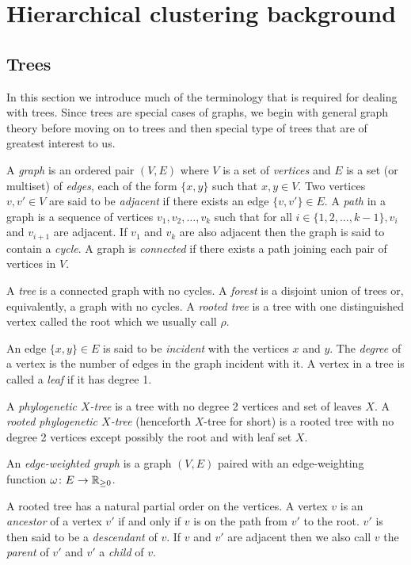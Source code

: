 \chapter{Hierarchical clustering background}
\label{cha:hier-clust-backgr}

\section{Trees}
\label{sec:trees}

In this section we introduce much of the terminology that is required for
dealing with trees.  Since trees are special cases of graphs, we begin with
general graph theory before moving on to trees and then special type of trees
that are of greatest interest to us.

A \textit{graph} is an ordered pair $(V,E)$ where $V$ is a set of
\textit{vertices} and $E$ is a set (or multiset) of \textit{edges}, each of
the form $\{x,y\}$ such that $x,y \in V$.  Two vertices $v,v' \in V$ are said
to be \textit{adjacent} if there exists an edge $\{v,v'\} \in E$.  A
\textit{path} in a graph is a sequence of vertices $v_1,v_2,\dotsc,v_k$ such
that for all $i \in \{1,2,\dotsc,k-1\}, v_i$ and $v_{i+1}$ are adjacent.  If
$v_1$ and $v_k$ are also adjacent then the graph is said to contain a
\textit{cycle}.  A graph is \textit{connected} if there exists a path joining
each pair of vertices in $V$.

A \textit{tree} is a connected graph with no cycles.  A \textit{forest} is a
disjoint union of trees or, equivalently, a graph with no cycles.  A
\textit{rooted tree} is a tree with one distinguished vertex called the root
which we usually call $\rho$.

An edge $\{x,y\} \in E$ is said to be \textit{incident} with the vertices $x$
and $y$.  The \textit{degree} of a vertex is the number of edges in the graph
incident with it.  A vertex in a tree is called a \textit{leaf} if it has
degree 1.

A \textit{phylogenetic $X$-tree} is a tree with no degree 2 vertices and set
of leaves $X$.  A \textit{rooted phylogenetic $X$-tree} (henceforth $X$-tree
for short) is a rooted tree with no degree 2 vertices except possibly the root
and with leaf set $X$.

An \textit{edge-weighted graph} is a graph $(V,E)$ paired with an
edge-weighting function $\omega \colon E \to {\mathbb R}_{\geq 0}$.

A rooted tree has a natural partial order on the vertices.  A vertex $v$ is an
\textit{ancestor} of a vertex $v'$ if and only if $v$ is on the path from $v'$
to the root.  $v'$ is then said to be a \textit{descendant} of $v$.  If $v$
and $v'$ are adjacent then we also call $v$ the \textit{parent} of $v'$ and
$v'$ a \textit{child} of $v$.

